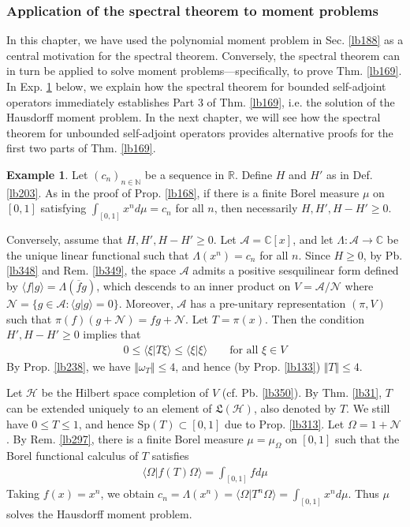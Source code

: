 \documentclass[12pt,b5paper,notitlepage]{article}
\theoremstyle{definition}
\newtheorem{eg}[df]{Example}
\theoremstyle{plain}
\newcommand{\fk}{\mathfrak}
\newcommand{\ovl}{\overline}
\newcommand{\bk}[1]{\langle {#1}\rangle}
\newcommand{\scr}{\mathscr}
\newcommand{\Cbb}{\mathbb C}
\newcommand{\Nbb}{\mathbb N}
\newcommand{\Rbb}{\mathbb R}
\newcommand{\Sp}{\mathrm{Sp}}
\newcommand{\MH}{\mathcal H}
\newcommand{\SA}{\mathscr A}
\newcommand{\hqed}{\hfill\qedsymbol}
\numberwithin{equation}{section}
\begin{document}
\subsubsection{Application of the spectral theorem to moment problems}


In this chapter, we have used the polynomial moment problem in Sec. \ref{lb188} as a central motivation for the spectral theorem. Conversely, the spectral theorem can in turn be applied to solve moment problems---specifically, to prove Thm. \ref{lb169}. In Exp. \ref{lb351} below, we explain how the spectral theorem for bounded self-adjoint operators immediately establishes Part 3 of Thm. \ref{lb169}, i.e. the solution of the Hausdorff moment problem. In the next chapter, we will see how the spectral theorem for unbounded self-adjoint operators provides alternative proofs for the first two parts of Thm. \ref{lb169}.





\begin{eg}\label{lb351}
Let $(c_n)_{n\in\Nbb}$ be a sequence in $\Rbb$. Define $H$ and $H'$ as in Def. \ref{lb203}. As in the proof of Prop. \ref{lb168}, if there is a finite Borel measure $\mu$ on $[0,1]$ satisfying $\int_{[0,1]}x^nd\mu=c_n$ for all $n$, then necessarily $H,H',H-H'\geq0$.

Conversely, assume that $H,H',H-H'\geq0$. Let $\SA=\Cbb[x]$, and let $\Lambda:\SA\rightarrow\Cbb$ be the unique linear functional such that $\Lambda(x^n)=c_n$ for all $n$. Since $H\geq0$, by Pb. \ref{lb348} and Rem. \ref{lb349}, the space $\SA$ admits a positive sesquilinear form defined by $\bk{f|g}=\Lambda(\ovl fg)$, which descends to an inner product on $V=\SA/\scr N$ where $\scr N=\{g\in\SA:\bk{g|g}=0\}$. Moreover, $\SA$ has a pre-unitary representation $(\pi,V)$ such that $\pi(f)(g+\scr N)=fg+\scr N$. Let $T=\pi(x)$. Then the condition $H',H-H'\geq0$ implies that 
\begin{align*}
0\leq\bk{\xi|T\xi}\leq \bk{\xi|\xi}\qquad\text{for all }\xi\in V
\end{align*}
By Prop. \ref{lb238}, we have $\Vert\omega_T\Vert\leq 4$, and hence (by Prop. \ref{lb133}) $\Vert T\Vert\leq 4$.

Let $\MH$ be the Hilbert space completion of $V$ (cf. Pb. \ref{lb350}). By Thm. \ref{lb31}, $T$ can be extended uniquely to an element of $\fk L(\MH)$, also denoted by $T$. We still have $0\leq T\leq 1$, and hence $\Sp(T)\subset[0,1]$ due to Prop. \ref{lb313}. Let $\Omega=1+\scr N$. By Rem. \ref{lb297}, there is a finite Borel measure $\mu=\mu_\Omega$ on $[0,1]$ such that the Borel functional calculus of $T$ satisfies
\begin{align*}
\bk{\Omega|f(T)\Omega}=\int_{[0,1]}fd\mu
\end{align*}
Taking $f(x)=x^n$, we obtain $c_n=\Lambda(x^n)=\bk{\Omega|T^n\Omega}=\int_{[0,1]}x^nd\mu$. Thus $\mu$ solves the Hausdorff moment problem.   \hqed
\end{eg}
\end{document}
